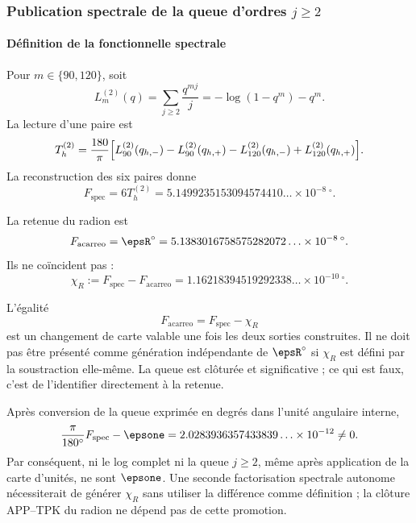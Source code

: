 \subsubsection{Publication spectrale de la queue d'ordres \(j\ge2\)}

\paragraph{Définition de la fonctionnelle spectrale}

Pour \(m\in\{90,120\}\), soit
\begin{equation}
L_m^{(2)}(q)=\sum_{j\ge2}\frac{q^{mj}}{j}
=-\log(1-q^m)-q^m.
\label{eq:L2}
\end{equation}
La lecture d'une paire est
\begin{equation}
T_h^{(2)}=\frac{180}{\pi}
\Bigl[
L_{90}^{(2)}(q_{h,-})-L_{90}^{(2)}(q_{h,+})
-L_{120}^{(2)}(q_{h,-})+L_{120}^{(2)}(q_{h,+})
\Bigr].
\label{eq:T-h}
\end{equation}
La reconstruction des six paires donne
\begin{equation}
F_{\mathrm{spec}}=6T_h^{(2)}
=5.1499235153094574410\ldots\times10^{-8}\,{}^\circ.
\label{eq:Fspec}
\end{equation}

La retenue du radion est
\[
F_{\mathrm{acarreo}}=\epsR^\circ
=5.1383016758575282072\ldots\times10^{-8}\,{}^\circ.
\]
Ils ne coïncident pas :
\begin{equation}
\chi_R:=F_{\mathrm{spec}}-F_{\mathrm{acarreo}}
=1.16218394519292338\ldots\times10^{-10}\,{}^\circ.
\label{eq:chiR}
\end{equation}

L’égalité
\[
F_{\mathrm{acarreo}}=F_{\mathrm{spec}}-\chi_R
\]
est un changement de carte valable une fois les deux sorties construites. Il ne doit pas
être présenté comme génération indépendante de \(\epsR^\circ\) si \(\chi_R\) est
défini par la soustraction elle-même. La queue est clôturée et significative ; ce qui est faux,
c'est de l'identifier directement à la retenue.

\begin{falsifier}
Après conversion de la queue exprimée en degrés dans l'unité angulaire interne,
\[
\frac{\pi}{180^\circ}F_{\mathrm{spec}}-\epsone
=2.0283936357433839\ldots\times10^{-12}\ne0.
\]
Par conséquent, ni le log complet ni la queue \(j\ge2\), même après application de la
carte d'unités, ne sont \(\epsone\). Une
seconde factorisation spectrale autonome nécessiterait de générer \(\chi_R\) sans
utiliser la différence comme définition ; la clôture APP--TPK du radion ne dépend pas
de cette promotion.
\end{falsifier}

